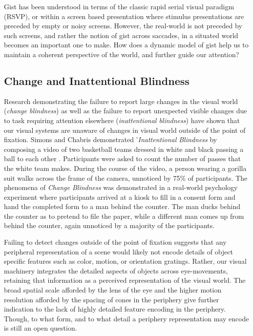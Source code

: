 Gist has been understood in terms of the classic rapid serial visual paradigm (RSVP), or within a screen based presentation where stimulus presentations are preceded by empty or noisy screens.  However, the real-world is not preceded by such screens, and rather the notion of gist across saccades, in a situated world becomes an important one to make.  How does a dynamic model of gist help us to maintain a coherent perspective of the world, and further guide our attention?  

\subsection{Change and Inattentional Blindness}

Research demonstrating the failure to report large changes in the visual world (\textit{change blindness}) as well as the failure to report unexpected visible changes due to task requiring attention elsewhere (\textit{inattentional blindness}) \cite{Simons1999,Rensink2000,Rensink2001,Hollingworth2001a} have shown that our visual systems are unaware of changes in visual world outside of the point of fixation.  Simons and Chabris demonstrated '\textit{Inattentional Blindness} by composing a video of two basketball teams dressed in white and black passing a ball to each other \cite{Simons1999}.  Participants were asked to count the number of passes that the white team makes.  During the course of the video, a person wearing a gorilla suit walks across the frame of the camera, unnoticed by 75\% of participants.  The phenomena of \textit{Change Blindness} was demonstrated in a real-world psychology experiment \cite{Simons1998} where participants arrived at a kiosk to fill in a consent form and hand the completed form to a man behind the counter.  The man ducks behind the counter as to pretend to file the paper, while a different man comes up from behind the counter, again unnoticed by a majority of the participants.  

Failing to detect changes outside of the point of fixation suggests that any peripheral representation of a scene would likely not encode details of object specific features such as color, motion, or orientation gratings.  Rather, our visual machinery integrates the detailed aspects of objects across eye-movements, retaining that information as a perceived representation of the visual world.  The broad spatial scale afforded by the lens of the eye and the higher motion resolution afforded by the spacing of cones in the periphery give further indication to the lack of highly detailed feature encoding in the periphery.  Though, to what form, and to what detail a periphery representation may encode is still an open question.  

